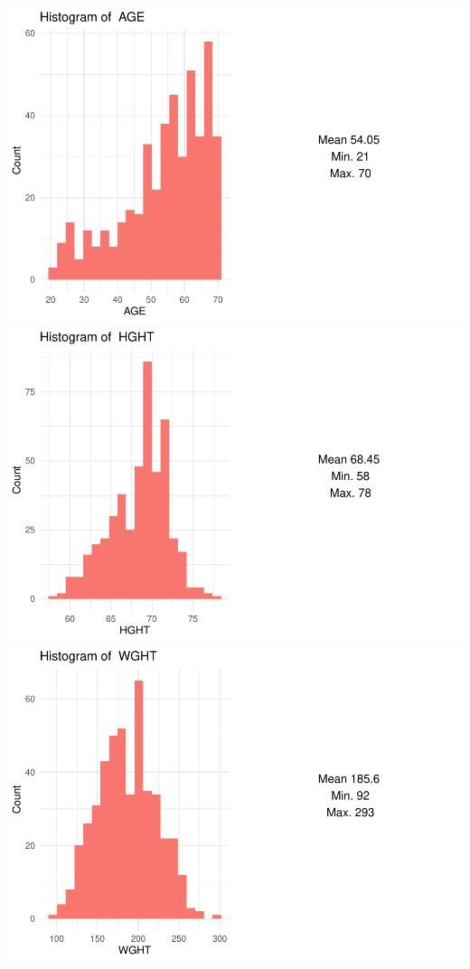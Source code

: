 \documentclass[
]{article}
\begin{document}
\includegraphics{Q1_markdown_files/figure-latex/unnamed-chunk-4-1.pdf}
\includegraphics{Q1_markdown_files/figure-latex/unnamed-chunk-4-2.pdf}
\includegraphics{Q1_markdown_files/figure-latex/unnamed-chunk-4-3.pdf}
\end{document}
